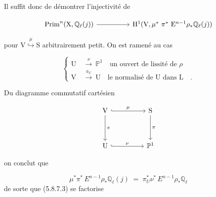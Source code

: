 Il suffit donc de démontrer l'injectivité de

\begin{equation*}
\begin{tikzcd}[column sep=huge]
\mathrm{Prim}^n(\mathrm{X},\mathbb{Q}_\ell(j)) \arrow[r] & \mathrm{H}^1(\mathrm{V},\mu^* \ \pi^* \ \mathrm{E}^{n-1}\rho_*\mathbb{Q}_\ell(j))
\end{tikzcd}
\end{equation*}

pour $\mathrm{V} \overset{\mu}{\hookrightarrow} \mathrm{S}$ arbitrairement petit. On est ramené au cas

\begin{equation*}
\left\{
\begin{aligned}
\mathrm{U} \ &\overset{\nu}{\longrightarrow} \ \mathbb{P}^1 \quad \text{un ouvert de lissité de } \rho \\
\mathrm{V} \ &\overset{\pi_{\mathrm{U}}}{\longrightarrow} \ \mathrm{U} \quad \text{le normalisé de U dans L} \quad .
\end{aligned}
\right.
\end{equation*}

Du diagramme commutatif cartésien

\begin{equation*}
\begin{tikzcd}[column sep=huge, row sep=huge]
\mathrm{V} \arrow[r, hook, "\mu"] \arrow[d, "\pi"] & \mathrm{S} \arrow[d, "\pi"] \\
\mathrm{U} \arrow[r, hook, "\nu"] & \mathbb{P}^1
\end{tikzcd}
\end{equation*}



 on conclut que

\begin{equation*}
\mu^*\pi^*\, E^{n-1}\rho_*\mathbb{Q}_\ell(j) \;=\; \pi_U^*\nu^*\, E^{n-1}\rho_*\mathbb{Q}_\ell
\end{equation*}
de sorte que (5.8.7.3) se factorise

